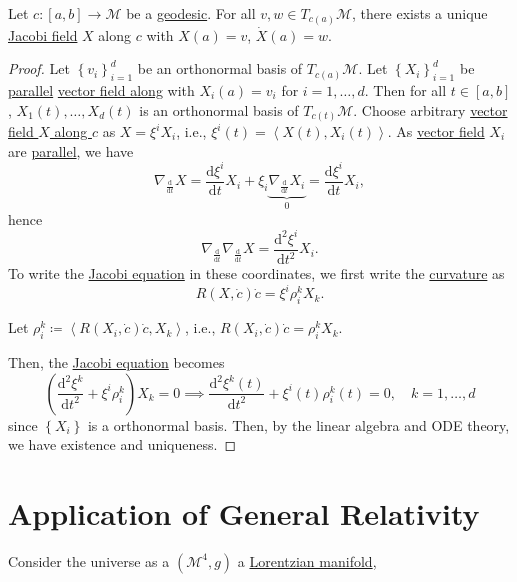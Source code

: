 \begin{theorem}
	Let \(c\colon [a, b] \to \mathcal{M} \) be a \hyperref[def:geodesic]{geodesic}. For all \(v, w\in T_{c(a)}\mathcal{M} \), there exists a unique \hyperref[def:Jacobi-field]{Jacobi field} \(X\) along \(c\) with \(X(a) = v\), \(\dot{X} (a) = w\).
\end{theorem}
\begin{proof}
	Let \(\left\{ v_i \right\} _{i=1}^d\) be an orthonormal basis of \(T_{c(a)} \mathcal{M} \). Let \(\left\{ X_i \right\} _{i=1}^d\) be \hyperref[def:parallel]{parallel} \hyperref[def:vector-field-along-curve]{vector field along} with \(X_i(a) = v_i\) for \(i = 1, \dots , d\). Then for all \(t\in [a, b]\), \(X_1(t), \dots , X_d(t)\) is an orthonormal basis of \(T_{c(t)}\mathcal{M} \). Choose arbitrary \hyperref[def:vector-field-along-curve]{vector field \(X\) along \(c\)} as \(X = \xi ^i X_i\), i.e., \(\xi ^i(t) = \left\langle X(t), X_i(t) \right\rangle \). As \hyperref[def:vector-field-along-curve]{vector field} \(X_i\) are \hyperref[def:parallel]{parallel}, we have
	\[
		\nabla _{\frac{\mathrm{d}}{\mathrm{d}t} } X
		= \frac{\mathrm{d}\xi ^i}{\mathrm{d}t} X_i + \xi _i \underbrace{\nabla _{\frac{\mathrm{d}}{\mathrm{d}t} } X_i }_{0}
		= \frac{\mathrm{d}\xi ^i}{\mathrm{d}t} X_i,
	\]
	hence
	\[
		\nabla _{\frac{\mathrm{d}}{\mathrm{d}t} }\nabla _{\frac{\mathrm{d}}{\mathrm{d}t} }X = \frac{\mathrm{d}^2 \xi ^i}{\mathrm{d}t^2} X_i .
	\]
	To write the \hyperref[eq:Jacobi]{Jacobi equation} in these coordinates, we first write the \hyperref[def:Riemannian-curvature]{curvature} as
	\[
		R(X, \dot{c} ) \dot{c} = \xi ^i \rho _i^k X_k.
	\]
	\begin{notation}[Rotation]
		Let \(\rho _i^k \coloneqq \left\langle R(X_i, \dot{c} )\dot{c}, X_k \right\rangle \), i.e., \(R(X_i, \dot{c} )\dot{c} = \rho _i^k X_k \).
	\end{notation}
	Then, the \hyperref[eq:Jacobi]{Jacobi equation} becomes
	\[
		\left( \frac{\mathrm{d}^2 \xi ^k}{\mathrm{d}t^2} + \xi ^i \rho _i^k \right) X_k = 0
		\implies \frac{\mathrm{d}^2 \xi ^k(t)}{\mathrm{d}t^2}  + \xi ^i(t) \rho _i^k(t) = 0,\quad k = 1, \dots , d
	\]
	since \(\left\{ X_i \right\} \) is a orthonormal basis. Then, by the linear algebra and ODE theory, we have existence and uniqueness.
\end{proof}

\section{Application of General Relativity}
Consider the universe as a \((\mathcal{M} ^4, g)\) a \hyperref[def:Lorentzian-metric]{Lorentzian manifold},
\begin{center}
\end{center}

